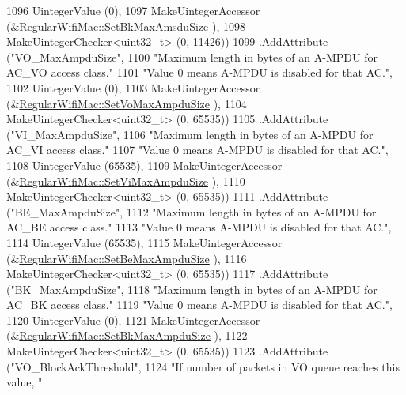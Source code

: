 \begin{DoxyCode}
1096                    UintegerValue (0),
1097                    MakeUintegerAccessor (&\hyperlink{classns3_1_1RegularWifiMac_a125bd1db09c527afa49572b9b5723532}{RegularWifiMac::SetBkMaxAmsduSize}
      ),
1098                    MakeUintegerChecker<uint32\_t> (0, 11426))
1099     .AddAttribute (\textcolor{stringliteral}{"VO\_MaxAmpduSize"},
1100                    \textcolor{stringliteral}{"Maximum length in bytes of an A-MPDU for AC\_VO access class."}
1101                    \textcolor{stringliteral}{"Value 0 means A-MPDU is disabled for that AC."},
1102                    UintegerValue (0),
1103                    MakeUintegerAccessor (&\hyperlink{classns3_1_1RegularWifiMac_aa3a33e97374743756cbc74517ba48cde}{RegularWifiMac::SetVoMaxAmpduSize}
      ),
1104                    MakeUintegerChecker<uint32\_t> (0, 65535))
1105     .AddAttribute (\textcolor{stringliteral}{"VI\_MaxAmpduSize"},
1106                    \textcolor{stringliteral}{"Maximum length in bytes of an A-MPDU for AC\_VI access class."}
1107                    \textcolor{stringliteral}{"Value 0 means A-MPDU is disabled for that AC."},
1108                    UintegerValue (65535),
1109                    MakeUintegerAccessor (&\hyperlink{classns3_1_1RegularWifiMac_aa4dfc64775735da1f66c1bb92332577e}{RegularWifiMac::SetViMaxAmpduSize}
      ),
1110                    MakeUintegerChecker<uint32\_t> (0, 65535))
1111     .AddAttribute (\textcolor{stringliteral}{"BE\_MaxAmpduSize"},
1112                    \textcolor{stringliteral}{"Maximum length in bytes of an A-MPDU for AC\_BE access class."}
1113                    \textcolor{stringliteral}{"Value 0 means A-MPDU is disabled for that AC."},
1114                    UintegerValue (65535),
1115                    MakeUintegerAccessor (&\hyperlink{classns3_1_1RegularWifiMac_a6d5f26156429a50bda6120ca5cad4fa4}{RegularWifiMac::SetBeMaxAmpduSize}
      ),
1116                    MakeUintegerChecker<uint32\_t> (0, 65535))
1117     .AddAttribute (\textcolor{stringliteral}{"BK\_MaxAmpduSize"},
1118                    \textcolor{stringliteral}{"Maximum length in bytes of an A-MPDU for AC\_BK access class."}
1119                    \textcolor{stringliteral}{"Value 0 means A-MPDU is disabled for that AC."},
1120                    UintegerValue (0),
1121                    MakeUintegerAccessor (&\hyperlink{classns3_1_1RegularWifiMac_af27091cca05caf74c4d53b60abd8d281}{RegularWifiMac::SetBkMaxAmpduSize}
      ),
1122                    MakeUintegerChecker<uint32\_t> (0, 65535))
1123     .AddAttribute (\textcolor{stringliteral}{"VO\_BlockAckThreshold"},
1124                    \textcolor{stringliteral}{"If number of packets in VO queue reaches this value, "}

\end{DoxyCode}
